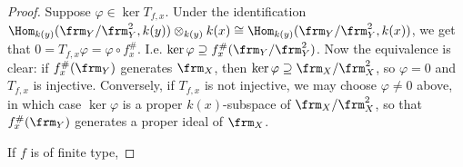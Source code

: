 \begin{proof}
	Suppose $\varphi \in \ker T_{f,x}$. Under the identification $\Hom_{k(y)}(\frm_Y/\frm_Y^2, k(y)) \otimes_{k(y)} k(x) \cong \Hom_{k(y)}(\frm_Y/\frm_Y^2, k(x))$, we get that $0 = T_{f,x}\varphi = \varphi \circ f^\#_x$. I.e. $\ker\varphi \supseteq f^\#_x(\frm_Y/\frm_Y^2)$. Now the equivalence is clear: if $f^\#_x(\frm_Y)$ generates $\frm_X$, then $\ker\varphi \supseteq \frm_X/\frm_X^2$, so $\varphi = 0$ and $T_{f,x}$ is injective. Conversely, if $T_{f,x}$ is not injective, we may choose $\varphi \neq 0$ above, in which case $\ker\varphi$ is a proper $k(x)$-subspace of $\frm_X/\frm_X^2$, so that $f^\#_x(\frm_Y)$ generates a proper ideal of $\frm_X$.
	
	If $f$ is of finite type, 
\end{proof}
